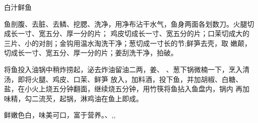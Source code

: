 \begin{recipe}{白汁鲜鱼}

\ingredients



\cooking

\step 鱼剖腹、去脏、去鳞、挖腮、洗净，用净布沾干水气，鱼身两面各划数刀。火腿切成长一寸、宽五分、厚一分的片；
鸡皮切成长一寸、宽五分的片；口茉切成大的三片、小的对剖；金钩用温水淘洗干净；葱切成一寸长的节;鲜笋去壳，取 嫩颠，切成长一寸、宽五分、厚一分的片；姜刮洗干净，拍破。

\step 将鱼投入油锅中稍炸捞起，泌去炸油留油二两，姜、
、葱下锅微楠一下，烹入清汤，即将火腿、鸡皮、口茉、鲜笋
放入，加料酒，投下鱼，并加胡椒、白糖、盐，在小火上烧五分钟翻面，继续烧五分钟，用竹筷将鱼拈入鱼盘内，锅内
再加味精，勾二流芡，起锅，淋鸡油在鱼上即成。

\notes

鲜嫩色白，味美可口，富于营养。、,,

\end{recipe}

